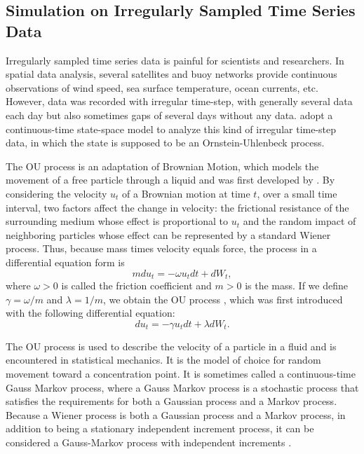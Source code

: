 \subsection{Simulation on Irregularly Sampled Time Series Data}

Irregularly sampled time series data is painful for scientists and researchers. In spatial data analysis, several satellites and buoy networks provide continuous observations of wind speed, sea surface temperature, ocean currents, etc. However, data was recorded with irregular time-step, with generally several data each day but also sometimes gaps of several days without any data. \cite{tandeo2011linear} adopt a continuous-time state-space model to analyze this kind of irregular time-step data, in which the state is supposed to be an Ornstein-Uhlenbeck process. 

The OU process is an adaptation of Brownian Motion, which models the movement of a free particle through a liquid and was first developed by \cite{einstein1956investigations}. 
By considering the velocity $u_t$ of a Brownian motion at time $t$, over a small time interval, two factors affect the change in velocity: the frictional resistance of the surrounding medium whose effect is proportional to $u_t$ and the random impact of neighboring particles whose effect can be represented by a standard Wiener process. Thus, because mass times velocity equals force, the process in a differential equation form is 
\begin{equation*}
mdu_t = -\omega u_tdt+dW_t,
\end{equation*}
where $\omega>0$ is called the friction coefficient and $m>0$ is the mass. If we define $\gamma = \omega /m$ and $\lambda = 1/m$, we obtain the OU process \citep{vaughan2015goodness}, which was first introduced with the following differential equation:
\begin{equation*}
du_t= -\gamma u_tdt+\lambda dW_t.
\end{equation*}


The OU process is used to describe the velocity of a particle in a fluid and is encountered in statistical mechanics. It is the model of choice for random movement toward a concentration point. It is sometimes called a continuous-time Gauss Markov process, where a Gauss Markov process is a stochastic process that satisfies the requirements for both a Gaussian process and a Markov process. Because a Wiener process is both a Gaussian process and a Markov process, in addition to being a stationary independent increment process, it can be considered a Gauss-Markov process with independent increments \citep{kijima1997markov}. 

